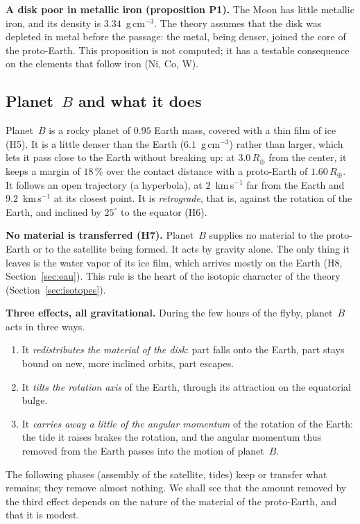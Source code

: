 \documentclass[11pt,a4paper]{article}
\newcommand{\Rt}{\ensuremath{R_\oplus}}
\begin{document}
\textbf{A disk poor in metallic iron (proposition P1).} The Moon has little metallic iron, and its density is $3.34$~g\,cm$^{-3}$. The theory assumes that the disk was depleted in metal before the passage: the metal, being denser, joined the core of the proto-Earth. This proposition is not computed; it has a testable consequence on the elements that follow iron (Ni, Co, W).

\subsection{Planet~$B$ and what it does}
\label{sec:B}

Planet~$B$ is a rocky planet of $0.95$ Earth mass, covered with a thin film of ice (H5). It is a little denser than the Earth ($6.1$~g\,cm$^{-3}$) rather than larger, which lets it pass close to the Earth without breaking up: at $3.0\,\Rt$ from the center, it keeps a margin of $18\,\%$ over the contact distance with a proto-Earth of $1.60\,\Rt$. It follows an open trajectory (a hyperbola), at $2$~km\,s$^{-1}$ far from the Earth and $9.2$~km\,s$^{-1}$ at its closest point. It is \emph{retrograde}, that is, against the rotation of the Earth, and inclined by $25^\circ$ to the equator (H6).

\textbf{No material is transferred (H7).} Planet~$B$ supplies no material to the proto-Earth or to the satellite being formed. It acts by gravity alone. The only thing it leaves is the water vapor of its ice film, which arrives mostly on the Earth (H8, Section~\ref{sec:eau}). This rule is the heart of the isotopic character of the theory (Section~\ref{sec:isotopes}).

\textbf{Three effects, all gravitational.} During the few hours of the flyby, planet~$B$ acts in three ways.
\begin{enumerate}[leftmargin=1.6em,itemsep=2pt]
\item It \emph{redistributes the material of the disk}: part falls onto the Earth, part stays bound on new, more inclined orbits, part escapes.
\item It \emph{tilts the rotation axis} of the Earth, through its attraction on the equatorial bulge.
\item It \emph{carries away a little of the angular momentum} of the rotation of the Earth: the tide it raises brakes the rotation, and the angular momentum thus removed from the Earth passes into the motion of planet~$B$.
\end{enumerate}
The following phases (assembly of the satellite, tides) keep or transfer what remains; they remove almost nothing. We shall see that the amount removed by the third effect depends on the nature of the material of the proto-Earth, and that it is modest.
\end{document}
